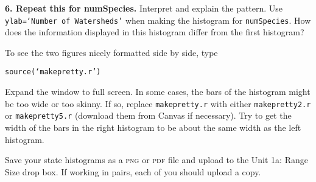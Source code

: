 \documentclass[11pt]{article}
\begin{document}
\vspace{7\baselineskip}


\textbf{6. Repeat this for numSpecies.} Interpret and explain the pattern. 
Use \texttt{ylab=‘Number of Watersheds’} when making the histogram for \texttt{numSpecies}.
How does the information displayed in this histogram differ from the first histogram?

\vspace{7\baselineskip}

To see the two figures nicely formatted side by side, type


\texttt{source(‘makepretty.r’)}

Expand the window to full screen. In some cases, the bars of the histogram might be too wide or too skinny. If so, replace \texttt{makepretty.r} with either \texttt{makepretty2.r} or \texttt{makepretty5.r} (download them from Canvas if necessary). Try to get the width of the bars in the right histogram to be about the same width as the left histogram.

Save your state histograms as a \textsc{png} or \textsc{pdf} file and upload to the Unit 1a: Range Size drop box. If working in pairs, each of you should upload a copy.
\end{document}
